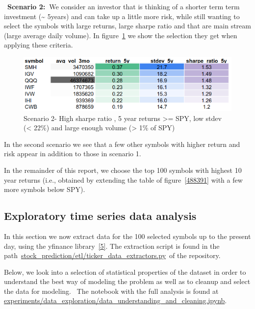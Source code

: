 \documentclass[10pt]{article}
\begin{document}
~\textbf{Scenario 2:~}We consider an investor that is thinking of a
shorter term term investment (\textasciitilde{} 5years) and can take up
a little more risk, while still wanting to select the symbols with large
returns, large sharpe ratio and that are main stream (large average
daily volume). In figure~{\ref{932441}} we show the
selection they get when applying these criteria.
\begin{figure}[H]
\begin{center}
\includegraphics[width=0.70\columnwidth]{figures/screenshot2/screenshot2}
\caption{{Scenario 2- High sharpe ratio , 5 year returns \textgreater{}= SPY, low
stdev (\textless{} 22\%) and large enough volume (\textgreater{} 1\% of
SPY)
{\label{932441}}%
}}
\end{center}
\end{figure}

In the second scenario we see that a few other symbols with higher
return and risk appear in addition to those in scenario 1.

In the remainder of this report, we choose the top 100 symbols with
highest 10 year returns (i.e., obtained by extending the table of
figure~{\ref{488391}} with a few more symbols below
SPY).~~

\hypertarget{exploratory-time-series-data-analysis}{%
\subsection{Exploratory time series data
analysis}\label{exploratory-time-series-data-analysis}}

In this section we now extract data for the 100 selected symbols up to
the present day, using the yfinance library~\hyperref[csl:5]{[5]}. The
extraction script is found in the
path~\href{https://github.com/marcoopsampaio/aws_ml_eng_project_stock_prediction/blob/main/stock_prediction/etl/ticker_data_extractors.py}{stock\_prediction/etl/ticker\_data\_extractors.py}~of
the repository.

Below, we look into a selection of statistical properties of the dataset
in order to understand the best way of modeling the problem as well as
to cleanup and select the data for modeling.~ The notebook with the full
analysis is found at
\href{https://github.com/marcoopsampaio/aws_ml_eng_project_stock_prediction/blob/main/experiments/data_exploration/data_understanding_and_cleaning.ipynb}{experiments/data\_exploration/data\_understanding\_and\_cleaning.ipynb}.
\end{document}

